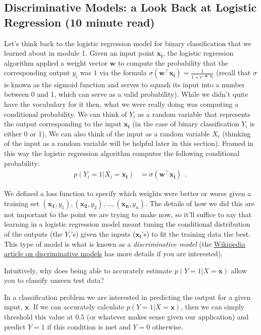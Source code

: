 \documentclass[assignment02_Solutions]{subfiles}
\begin{document}
\subsection{Discriminative Models: a Look Back at Logistic Regression (10 minute read)}

Let's think back to the logistic regression model for binary classification that we learned about in module 1.  Given an input point $\mathbf{x_i}$, the logistic regression algorithm applied a weight vector $\mathbf{w}$ to compute the probability that the corresponding output $y_i$ was 1 via the formula $\sigma(\mathbf{w}^\top \mathbf{x_i}) = \frac{1}{1+e^{-\mathbf{w}^\top \mathbf{x_i}}}$ (recall that $\sigma$ is known as the sigmoid function and serves to squash its input into a number between 0 and 1, which can serve as a valid probability).  While we didn't quite have the vocabulary for it then, what we were really doing was computing a conditional probability.  We can think of $Y_i$ as a random variable that represents the output corresponding to the input $\mathbf{x_i}$ (in the case of binary classification $Y_i$ is either 0 or 1).  We can also think of the input as a random variable $X_i$ (thinking of the input as a random variable will be helpful later in this section).  Framed in this way the logistic regression algorithm computes the following conditional probability:
\begin{align}
p(Y_i = 1 | X_i = \mathbf{x_i}) &= \sigma(\mathbf{w}^\top \mathbf{x_i}) \enspace .
\end{align}

We defined a loss function to specify which weights were better or worse given a training set $(\mathbf{x_1}, y_1), (\mathbf{x_2}, y_2), \ldots, (\mathbf{x_n}, y_n)$.  The details of how we did this are not important to the point we are trying to make now, so it'll suffice to say that learning in a logistic regression model meant tuning the conditional distribution of the outputs (the $Y_i$'s) given the inputs ($\mathbf{x_i}$'s) to fit the training data the best.  This type of model is what is known as a \emph{discriminative model} (the \href{https://en.wikipedia.org/wiki/Discriminative_model}{Wikipedia article on discriminative models} has more details if you are interested).

\vspace{1em}

\begin{understandingcheck}
Intuitively, why does being able to accurately estimate $p(Y = 1 | X = \mathbf{x})$ allow you to classify unseen test data?

\begin{boxedsolution}
In a classification problem we are interested in predicting the output for a given input, $\mathbf{x}$.  If we can accurately calculate $p(Y=1|X = \mathbf{x})$, then we can simply threshold this value at $0.5$ (or whatever makes sense given our application) and predict $Y = 1$ if this condition is met and $Y = 0$ otherwise.
\end{boxedsolution}
\end{understandingcheck}
\end{document}
